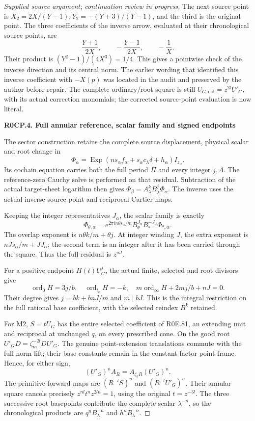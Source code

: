 \begin{proof}[Supplied source argument; continuation review in progress]
The next source point is
\(X_2=2X/(Y-1),Y_2=-(Y+3)/(Y-1)\), and the third is the original
point. The three coefficients of the inverse arrow, evaluated at
their chronological source points, are
\[
 \frac{Y+1}{2X},\qquad -\frac{Y-1}{2X},\qquad-\frac1X.
\]
Their product is \((Y^2-1)/(4X^3)=1/4\). This gives a pointwise
check of the inverse direction and its central norm. The earlier
wording that identified this inverse coefficient with \(-X(p)\)
was located in the audit and preserved by the author before repair.
The complete ordinary/root square is still
\(U_{G,\mathrm{old}}=z^{2l}U'_G\), with its actual correction
monomials; the corrected source-point evaluation is now literal.

\par

\medskip\noindent\textbf{R0CP.4. Full annular reference, scalar family and signed endpoints}

\par\nobreak

The sector construction retains the complete source displacement,
physical scalar and root change in
\[
 \Phi_\alpha=\operatorname{Exp}
 (ns_\alpha f_\alpha+s_\alpha c_\lambda\delta+h_\alpha)I_{z_\alpha}.
\]
Its cochain equation carries both the full period \(\Pi\) and every
integer \(j,\Lambda\). The reference-zero Cauchy solve is performed
on that residual. Subtraction of the actual target-sheet logarithm
then gives \(\Phi_\beta=A_\lambda^kB_\lambda^j\Phi_\alpha\).
The inverse uses the actual inverse source point and reciprocal
Cartier maps.

Keeping the integer representatives \(J_\alpha\), the scalar family
is exactly
\[
 \Phi_{\theta,\alpha}=e^{2\pi in\theta s_\alpha/m}
 B_\theta^{J_\alpha}B_*^{-J_\alpha}\Phi_{*,\alpha}.
\]
The overlap exponent is \(n\theta k/m+\theta j\). At integer
winding \(J\), the extra exponent is
\(nJs_\alpha/m+JJ_\alpha\); the second term is an integer after
it has been carried through the square. Thus the full residual is
\(z^{nJ}\).

For a positive endpoint \(H(t)U_G^j\), the actual finite, selected
and root divisors give
\[
 \operatorname{ord}_0H=3j/b,\quad
 \operatorname{ord}_{t_c}H=-k,\quad
 m\operatorname{ord}_\infty H+2mj/b+nJ=0.
\]
Their degree gives \(j=bk+bnJ/m\) and \(m\mid bJ\).
This is the integral restriction on the full rational base
coefficient, with the selected reindex \(B^k\) retained.

For M2, \(S=tU_G\) has the entire selected coefficient of R0E.81,
an extending unit and reciprocal at unchanged \(q\), on every
prescribed cone. On the good root
\(U'_GD=\zeta_m^{-2l}DU'_G\). The genuine point-extension
translations commute with the full norm lift; their base constants
remain in the constant-factor point frame. Hence, for either sign,
\[
 (U'_G)^nA_R=A_{\zeta_3R}(U'_G)^n.
\]
The primitive forward maps are
\((R^{-l}S)^n\) and \((R^{-l}U'_G)^n\). Their annular square
cancels precisely
\(z^{nl}t^nz^{2ln}=1\), using the original \(t=z^{-3l}\).
The three successive root basepoints contribute the complete scalar
\(\lambda^{-n}\), so the chronological products are
\(q^nB_\lambda^{-n}\) and \(h^nB_\lambda^{-n}\).


\end{proof}
